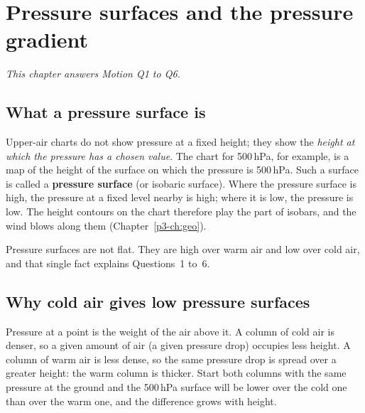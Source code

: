 \chapter{Pressure surfaces and the pressure gradient}\label{p3-ch:surfaces}

\textit{This chapter answers Motion Q1 to Q6.}

\section{What a pressure surface is}

Upper-air charts do not show pressure at a fixed height; they show the \emph{height at which the pressure has a chosen value}. The chart for 500\,hPa, for example, is a map of the height of the surface on which the pressure is 500\,hPa. Such a surface is called a \textbf{pressure surface} (or isobaric surface). Where the pressure surface is high, the pressure at a fixed level nearby is high; where it is low, the pressure is low. The height contours on the chart therefore play the part of isobars, and the wind blows along them (Chapter~\ref{p3-ch:geo}).

Pressure surfaces are not flat. They are high over warm air and low over cold air, and that single fact explains Questions~1 to~6.

\section{Why cold air gives low pressure surfaces}

Pressure at a point is the weight of the air above it. A column of cold air is denser, so a given amount of air (a given pressure drop) occupies less height. A column of warm air is less dense, so the same pressure drop is spread over a greater height: the warm column is thicker. Start both columns with the same pressure at the ground and the 500\,hPa surface will be lower over the cold one than over the warm one, and the difference grows with height.

